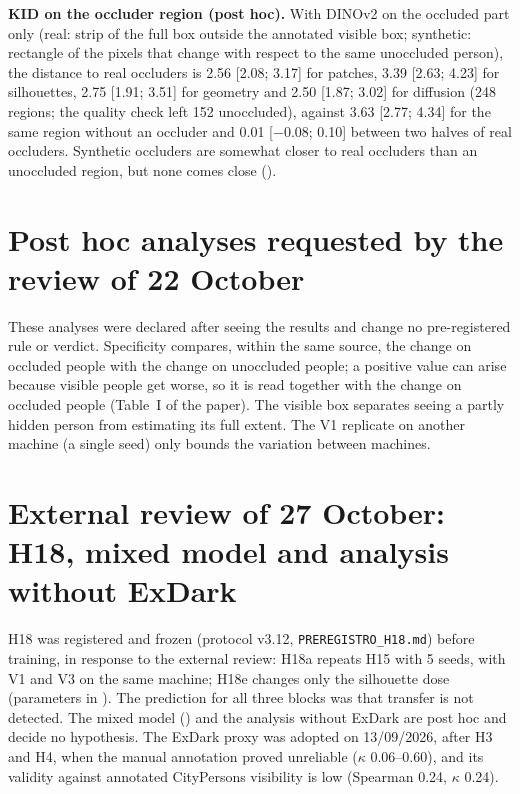 \documentclass[10pt]{article}
\begin{document}
\noindent\textbf{KID on the occluder region (post hoc).} With DINOv2 on the occluded part only (real: strip of the full box outside the annotated visible box; synthetic: rectangle of the pixels that change with respect to the same unoccluded person), the distance to real occluders is 2.56 [2.08; 3.17] for patches, 3.39 [2.63; 4.23] for silhouettes, 2.75 [1.91; 3.51] for geometry and 2.50 [1.87; 3.02] for diffusion (248 regions; the quality check left 152 unoccluded), against 3.63 [2.77; 4.34] for the same region without an occluder and 0.01 [$-$0.08; 0.10] between two halves of real occluders. Synthetic occluders are somewhat closer to real occluders than an unoccluded region, but none comes close ().

\section{Post hoc analyses requested by the review of 22 October}
These analyses were declared after seeing the results and change no pre-registered rule or verdict. Specificity compares, within the same source, the change on occluded people with the change on unoccluded people; a positive value can arise because visible people get worse, so it is read together with the change on occluded people (Table~I of the paper). The visible box separates seeing a partly hidden person from estimating its full extent. The V1 replicate on another machine (a single seed) only bounds the variation between machines.



\section{External review of 27 October: H18, mixed model and analysis without ExDark}
H18 was registered and frozen (protocol v3.12, \texttt{PREREGISTRO\_H18.md}) before training, in response to the external review: H18a repeats H15 with 5 seeds, with V1 and V3 on the same machine; H18e changes only the silhouette dose (parameters in ). The prediction for all three blocks was that transfer is not detected. The mixed model () and the analysis without ExDark are post hoc and decide no hypothesis. The ExDark proxy was adopted on 13/09/2026, after H3 and H4, when the manual annotation proved unreliable ($\kappa$ 0.06--0.60), and its validity against annotated CityPersons visibility is low (Spearman 0.24, $\kappa$ 0.24).
\end{document}
